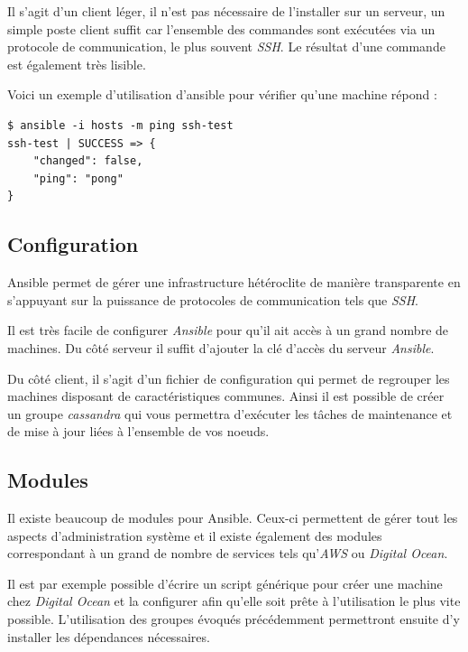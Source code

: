 \bigskip

Il s'agit d'un client léger, il n'est pas nécessaire de l'installer sur
un serveur, un simple poste client suffit car l'ensemble des commandes
sont exécutées via un protocole de communication, le plus souvent
\emph{SSH}. Le résultat d'une commande est également très lisible.

\bigskip

Voici un exemple d'utilisation d'ansible pour vérifier qu'une machine
répond :

\begin{verbatim}
$ ansible -i hosts -m ping ssh-test
ssh-test | SUCCESS => {
    "changed": false,
    "ping": "pong"
}
\end{verbatim}

\newpage

\subsection{Configuration}\label{configuration}

Ansible permet de gérer une infrastructure hétéroclite de manière
transparente en s'appuyant sur la puissance de protocoles de
communication tels que \emph{SSH}.

\bigskip

Il est très facile de configurer \emph{Ansible} pour qu'il ait accès à
un grand nombre de machines. Du côté serveur il suffit d'ajouter la clé
d'accès du serveur \emph{Ansible}.

\bigskip

Du côté client, il s'agit d'un fichier de configuration qui permet de
regrouper les machines disposant de caractéristiques communes. Ainsi il
est possible de créer un groupe \emph{cassandra} qui vous permettra
d'exécuter les tâches de maintenance et de mise à jour liées à
l'ensemble de vos noeuds.

\newpage

\subsection{Modules}\label{modules}

Il existe beaucoup de modules pour Ansible. Ceux-ci permettent de gérer
tout les aspects d'administration système et il existe également des
modules correspondant à un grand de nombre de services tels
qu'\emph{AWS} ou \emph{Digital Ocean}.

\bigskip

Il est par exemple possible d'écrire un script générique pour créer une
machine chez \emph{Digital Ocean} et la configurer afin qu'elle soit
prête à l'utilisation le plus vite possible. L'utilisation des groupes
évoqués précédemment permettront ensuite d'y installer les dépendances
nécessaires.

